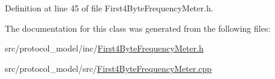Definition at line 45 of file First4\-Byte\-Frequency\-Meter.\-h.



The documentation for this class was generated from the following files\-:\begin{DoxyCompactItemize}
\item 
src/protocol\-\_\-model/inc/\hyperlink{_first4_byte_frequency_meter_8h}{First4\-Byte\-Frequency\-Meter.\-h}\item 
src/protocol\-\_\-model/src/\hyperlink{_first4_byte_frequency_meter_8cpp}{First4\-Byte\-Frequency\-Meter.\-cpp}\end{DoxyCompactItemize}
